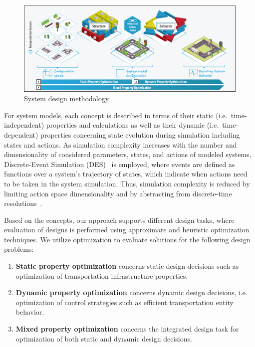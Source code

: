 \documentclass[a4paper,twoside]{article}
\begin{document}
	\begin{figure}[!ht]
		\centering
		\includegraphics[width=1.0\columnwidth]{property_optimization.png}
		\caption{System design methodology}
		\label{fig:concept}
	\end{figure}
	
	For system models, each concept is described in terms of their static (i.e.\ time-independent) properties and calculations as well as their dynamic (i.e.\ time-dependent) properties concerning state evolution during simulation including states and actions.
	As simulation complexity increases with the number and dimensionality of considered parameters, states, and actions of modeled systems, Discrete-Event Simulation (DES)~\cite{fishman2001discrete} is employed, where events are defined as functions over a system's trajectory of states, which indicate when actions need to be taken in the system simulation.
	Thus, simulation complexity is reduced by limiting action space dimensionality and by abstracting from discrete-time resolutions~\cite{ascher2023discrete}.
	
	
	Based on the concepts, our approach supports different design tasks, where evaluation of designs is performed using approximate and heuristic optimization techniques. We utilize optimization to evaluate solutions for the following design problems:
	
	\begin{enumerate}
		\item \textbf{Static property optimization} concerns static design decisions such as optimization of transportation infrastructure properties.
		\item \textbf{Dynamic property optimization} concerns dynamic design decisions, i.e. optimization of control strategies such as efficient transportation entity behavior.
		\item \textbf{Mixed property optimization} concerns the integrated design task for optimization of both static and dynamic design decisions.
	\end{enumerate}
	
\end{document}
